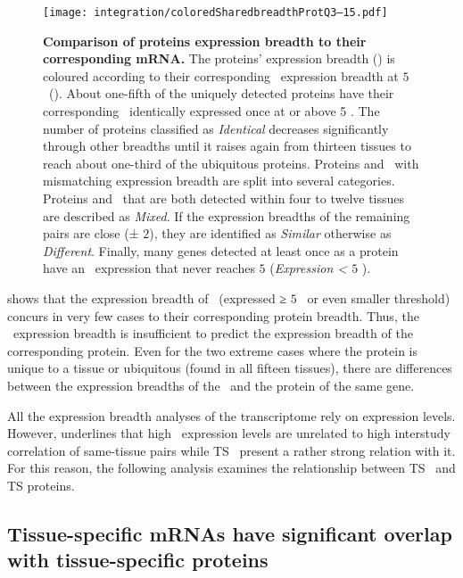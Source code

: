 \begin{figure}[!htb]
    \texttt{[image: integration/coloredSharedbreadthProtQ3--15.pdf]}\centering
    \vspace{-4mm}
    \caption[Comparison of proteins expression breadth to
    corresponding mRNA breadth]{\label{fig:SharedBreadthProtQ3}%
    \textbf{Comparison of proteins expression breadth to their corresponding mRNA.}
    The proteins' expression breadth ()
    is coloured according to
    their corresponding \mRNA\ expression breadth at $5$ \FPKM\
    ().
    About one-fifth of the uniquely detected proteins have
    their corresponding \mRNA\ identically expressed once at or above 5 \FPKM{}.
    The number of proteins classified as \emph{Identical} decreases significantly
    through other breadths until it raises again from thirteen tissues
    to reach about one-third of the ubiquitous proteins.
    Proteins and \mRNAs\ with mismatching expression breadth are split into
    several categories.
    Proteins and \mRNAs\ that are both detected within four to twelve tissues
    are described as \emph{Mixed}.
    If the expression breadths of the remaining pairs are close (± $2$),
    they are identified as \emph{Similar} otherwise as \emph{Different}.
    Finally, many genes detected at least once as a protein have
    an \mRNA\ expression that never reaches $5$ \FPKM{} (\emph{Expression < $5$ \FPKM}).
    }
\end{figure}

 shows that the expression breadth
of \mRNAs\ (expressed ≥ $5$ \FPKM\ or even smaller threshold) concurs
in very few cases to their corresponding protein breadth.
Thus, the \mRNA\ expression breadth is insufficient
to predict the expression breadth of the corresponding protein.
Even for the two extreme cases
where the protein is unique to a tissue or ubiquitous (found in all fifteen tissues),
there are differences between the expression breadths of the \mRNA\ and the protein
of the same gene.\mybr\

All the expression breadth analyses of the transcriptome rely on expression levels.
However, \Cref{ch:Transcriptomics} underlines that
high \mRNA\ expression levels are unrelated
to high interstudy correlation of same-tissue pairs
while \gls{TS} \mRNAs\ present a rather strong relation with it.
For this reason, the following analysis examines
the relationship between \gls{TS} \mRNAs\ and \gls{TS} proteins.\mybr\


\subsection{Tissue-specific \texorpdfstring{\MakeLowercase{m}RNAs}{mRNAs} %
have significant overlap with tissue-specific proteins}\label{sec:TSprotMrna}

